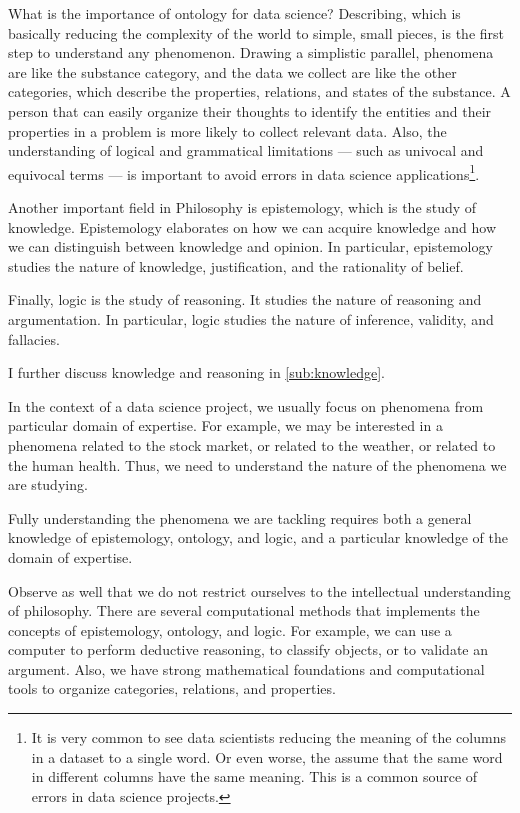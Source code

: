 What is the importance of ontology for data science?  Describing, which is basically
reducing the complexity of the world to simple, small pieces, is the first step to
understand any phenomenon.  Drawing a simplistic parallel, phenomena are like the
substance category, and the data we collect are like the other categories, which describe
the properties, relations, and states of the substance.  A person that can easily organize
their thoughts to identify the entities and their properties in a problem is more likely
to collect relevant data.  Also, the understanding of logical and grammatical limitations
--- such as univocal and equivocal terms --- is important to avoid errors in data
science applications\footnote{It is very common to see data scientists reducing the
meaning of the columns in a dataset to a single word.  Or even worse, the assume
that the same word in different columns have the same meaning.  This is a common source
of errors in data science projects.}.

Another important field in Philosophy is epistemology, which is the study of knowledge.
Epistemology elaborates on how we can acquire knowledge and how we can distinguish between
knowledge and opinion.  In particular, epistemology studies the nature of knowledge,
justification, and the rationality of belief.

Finally, logic is the study of reasoning.  It studies the nature of reasoning and
argumentation.  In particular, logic studies the nature of inference, validity, and
fallacies.

I further discuss knowledge and reasoning in \cref{sub:knowledge}.

In the context of a data science project, we usually focus on phenomena from particular domain of
expertise.  For example, we may be interested in a phenomena related to the stock
market, or related to the weather, or related to the human
health.  Thus, we need to understand the nature of the phenomena we are studying.

Fully understanding the phenomena we are tackling requires both a general knowledge
of epistemology, ontology, and logic, and a particular knowledge of the domain of
expertise.

Observe as well that we do not restrict ourselves to the intellectual understanding of
philosophy.  There are several computational methods that implements the concepts of
epistemology, ontology, and logic.  For example, we can use a computer to perform
deductive reasoning, to classify objects, or to validate an argument.  Also, we have
strong mathematical foundations and computational tools to organize categories, relations, and
properties.

